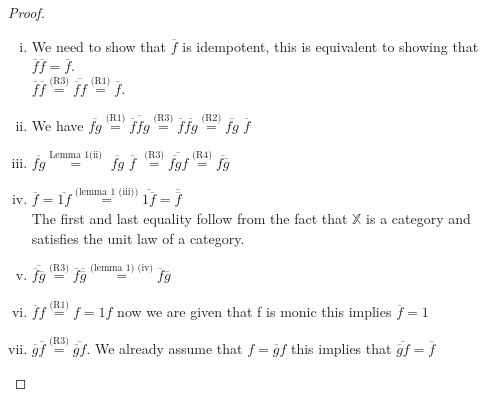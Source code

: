 \documentclass[11pt, oneside]{amsart}
\theoremstyle{definition}
\theoremstyle{definition}
\begin{document}
\begin{proof}~
\begin{enumerate}[(i)]
\item We need to show that $\overline{f}$ is idempotent, this is equivalent to showing that $\overline{f}\overline{f}=\overline{f}.$\\
$\overline{f}\overline{f}\stackrel{\text{(R3)}}{=}\overline{\overline{f}f}\stackrel{\text{(R1)}}{=}\overline{f}$.
\item We have $\overline{fg}\stackrel{\text{(R1)}}{=}\overline{{\overline{f}fg}}\stackrel{\text{(R3)}}{=}\overline{f}\overline{fg}\stackrel{\text{(R2)}}{=}\overline{fg}$ $\overline{f}$
\item $\overline{fg}\stackrel{\text{Lemma 1(ii)}}{=}$ $\overline{fg}$ $\overline{f}$ $\stackrel{\text{(R3)}}{=}\overline{\overline{fg}f}\stackrel{\text{(R4)}}{=}\overline{f\overline{g}}$
\item $\overline{f}=\overline{1f}\stackrel{\text{(lemma 1 (iii))}}{=}{\overline{1\overline{f}}=\overline{\overline{f}}}$\\
The first and last equality follow from the fact that $\mathbb{X}$ is a category and satisfies the unit law of a category.
\item $\overline{\overline{f}\overline{g}}\stackrel{\text{(R3)}}{=}\overline{f}\overline{{\overline{g}}}\stackrel{\text{(lemma 1) (iv)}}{=}\overline{f}\overline{g}$
\item $\overline{f}{f}\stackrel{\text{(R1)}}{=}f=1f$ now we are given that f is monic this implies $\overline{f}=1$
\item $\overline{g}\overline{f}\stackrel{\text{(R3)}}{=}\overline{\overline{g}f}$. We already assume that $f=\overline{g}f$ this implies that $\overline{\overline{g}f}=\overline{f}$
\end{enumerate}
\end{proof}
\end{document}
